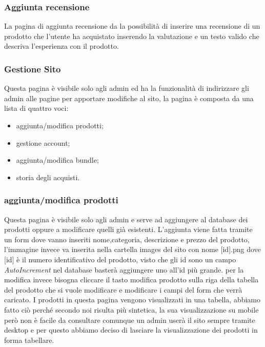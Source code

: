 \subsubsection{Aggiunta recensione}
La pagina di aggiunta recensione da la possibilità di inserire una recensione di un prodotto che l'utente ha acquistato inserendo la valutazione e un testo valido che descriva l'esperienza con il prodotto.

\subsubsection{Gestione Sito}
Questa pagina è visibile solo agli admin ed ha la funzionalità di indirizzare gli admin alle pagine per apportare modifiche al sito, la pagina è composta da una lista di quattro voci:
\begin{itemize}
	\item aggiunta/modifica prodotti;
	\item gestione account;
	\item aggiunta/modifica bundle;
	\item storia degli acquisti.
\end{itemize}

\subsubsection{aggiunta/modifica prodotti}
Questa pagina è visibile solo agli admin e serve ad aggiungere al database dei prodotti oppure a modificare quelli già esistenti.\newline
L'aggiunta viene fatta tramite un form dove vanno inseriti nome,categoria, descrizione e prezzo del prodotto, l'immagine invece va inserita nella cartella images del sito con nome [id].png dove [id] è il numero identificativo del prodotto, visto che gli id sono un campo \emph{AutoIncrement} nel database basterà aggiungere uno all'id più grande.\newline
per la modifica invece bisogna cliccare il tasto modifica prodotto sulla riga della tabella del prodotto che si vuole modificare e modificare i campi del form che verrà caricato.\newline
I prodotti in questa pagina vengono visualizzati in una tabella, abbiamo fatto ciò perché secondo noi risulta più sintetica, la sua visualizzazione su mobile però non è facile da consultare comunque un admin userà il sito sempre tramite desktop e per questo abbiamo deciso di lasciare la visualizzazione dei prodotti in forma tabellare.

